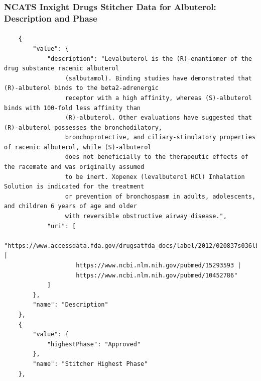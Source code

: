 \documentclass[aspectratio=169,xcolor=dvipsnames]{beamer}
\begin{document}
\begin{frame}[fragile,t]
  \frametitle{NCATS Inxight Drugs Stitcher Data for Albuterol: Description and Phase}
  \framesubtitle{}
  \tiny
\begin{verbatim}
    {
        "value": {
            "description": "Levalbuterol is the (R)-enantiomer of the drug substance racemic albuterol
                 (salbutamol). Binding studies have demonstrated that (R)-albuterol binds to the beta2-adrenergic
                 receptor with a high affinity, whereas (S)-albuterol binds with 100-fold less affinity than
                 (R)-albuterol. Other evaluations have suggested that (R)-albuterol possesses the bronchodilatory,
                 bronchoprotective, and ciliary-stimulatory properties of racemic albuterol, while (S)-albuterol
                 does not beneficially to the therapeutic effects of the racemate and was originally assumed
                 to be inert. Xopenex (levalbuterol HCl) Inhalation Solution is indicated for the treatment
                 or prevention of bronchospasm in adults, adolescents, and children 6 years of age and older
                 with reversible obstructive airway disease.",
            "uri": [
                "https://www.accessdata.fda.gov/drugsatfda_docs/label/2012/020837s036lbl.pdf |
                    https://www.ncbi.nlm.nih.gov/pubmed/15293593 |
                    https://www.ncbi.nlm.nih.gov/pubmed/10452786"
            ]
        },
        "name": "Description"
    },
    {
        "value": {
            "highestPhase": "Approved"
        },
        "name": "Stitcher Highest Phase"
    },
\end{verbatim}
\end{frame}
\end{document}
